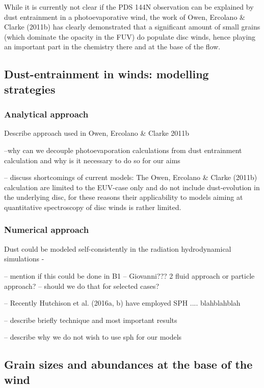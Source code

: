 \documentclass[10pt,fleqn,twoside]{article}
\begin{document}
While it is currently not clear if the PDS 144N observation can be
explained by dust entrainment in a photoevaporative wind, the work of
Owen, Ercolano \& Clarke (2011b) has clearly demonstrated that a
significant amount of small grains (which dominate the opacity in the
FUV) do populate disc winds, hence playing an important part in the
chemistry there and at the base of the flow. 

\subsection{Dust-entrainment in winds: modelling strategies}

\subsubsection{Analytical approach}\label{sec:analytical_approach}

{\color{red}Describe approach used in Owen, Ercolano \& Clarke 2011b

--why can we decouple photoevaporation calculations from dust
entrainment calculation and why is it necessary to do so for our aims

-- discuss shortcomings of current models: The Owen, Ercolano \& Clarke (2011b) calculation are limited to the EUV-case
only and do not include dust-evolution in the underlying disc, for
these reasons their applicability to models aiming at quantitative
spectroscopy of disc winds is rather limited. 
}

\subsubsection{Numerical approach}

{\color{red}Dust could be modeled self-consistently in the
  radiation hydrodynamical simulations - 

-- mention if this could be done in B1 -- Giovanni??? 2 fluid approach
or particle approach? -- should we do that for selected cases? 

-- Recently Hutchison et al. (2016a, b) have employed SPH
.... blahblahblah 

-- describe briefly technique and most important results 

-- describe why we do not wish to use sph for our models 

}

\subsection{Grain sizes and abundances at the base of the wind}
\end{document}
